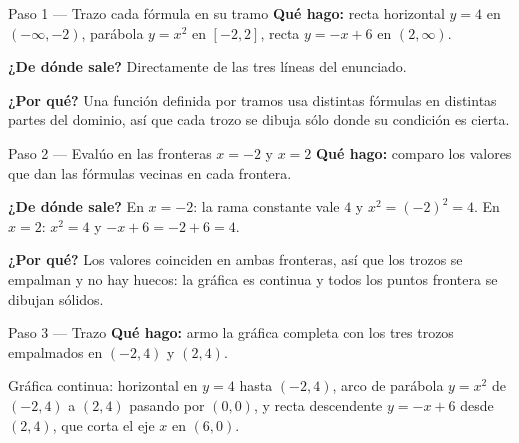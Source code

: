\documentclass[11pt]{article}
\begin{document}
\begin{paso}{Paso 1 --- Trazo cada fórmula en su tramo}
\textbf{Qué hago:} recta horizontal $y=4$ en $(-\infty,-2)$, parábola $y=x^2$ en $[-2,2]$, recta $y=-x+6$ en $(2,\infty)$.

\textbf{¿De dónde sale?} Directamente de las tres líneas del enunciado.

\textbf{¿Por qué?} Una función definida por tramos usa distintas fórmulas en distintas partes del dominio, así que cada trozo se dibuja sólo donde su condición es cierta.
\end{paso}

\begin{paso}{Paso 2 --- Evalúo en las fronteras $x=-2$ y $x=2$}
\textbf{Qué hago:} comparo los valores que dan las fórmulas vecinas en cada frontera.

\textbf{¿De dónde sale?} En $x=-2$: la rama constante vale $4$ y $x^2=(-2)^2=4$. En $x=2$: $x^2=4$ y $-x+6=-2+6=4$.

\textbf{¿Por qué?} Los valores coinciden en ambas fronteras, así que los trozos se empalman y no hay huecos: la gráfica es continua y todos los puntos frontera se dibujan sólidos.
\end{paso}

\begin{paso}{Paso 3 --- Trazo}
\textbf{Qué hago:} armo la gráfica completa con los tres trozos empalmados en $(-2,4)$ y $(2,4)$.

\begin{center}
\end{center}
\end{paso}

\begin{resp}
Gráfica continua: horizontal en $y=4$ hasta $(-2,4)$, arco de parábola $y=x^2$ de $(-2,4)$ a $(2,4)$ pasando por $(0,0)$, y recta descendente $y=-x+6$ desde $(2,4)$, que corta el eje $x$ en $(6,0)$.
\end{resp}
\end{document}
